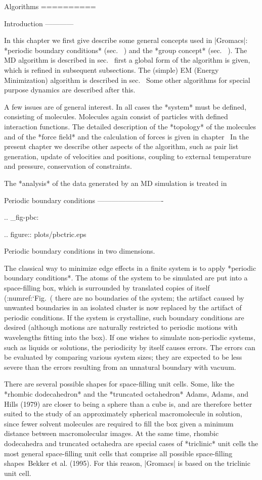 Algorithms
==========

Introduction
------------

In this chapter we first give describe some general concepts used in
|Gromacs|: *periodic boundary conditions*
(sec. 
) and the *group concept*
(sec. 
). The MD algorithm is
described in sec. 
first a global form of the
algorithm is given, which is refined in subsequent subsections. The
(simple) EM (Energy Minimization) algorithm is described in
sec. 
Some other algorithms for special
purpose dynamics are described after this.

A few issues are of general interest. In all cases the *system* must be
defined, consisting of molecules. Molecules again consist of particles
with defined interaction functions. The detailed description of the
*topology* of the molecules and of the *force field* and the calculation
of forces is given in chapter 
In the present
chapter we describe other aspects of the algorithm, such as pair list
generation, update of velocities and positions, coupling to external
temperature and pressure, conservation of constraints.

The *analysis* of the data generated by an MD simulation is treated in 

Periodic boundary conditions
----------------------------

.. _fig-pbc:

.. figure:: plots/pbctric.eps

   Periodic boundary conditions in two dimensions.

The classical way to minimize edge effects in a finite system is to
apply *periodic boundary conditions*. The atoms of the system to be
simulated are put into a space-filling box, which is surrounded by
translated copies of itself (:numref:`Fig. (%
there are no boundaries of the system; the artifact caused by unwanted
boundaries in an isolated cluster is now replaced by the artifact of
periodic conditions. If the system is crystalline, such boundary
conditions are desired (although motions are naturally restricted to
periodic motions with wavelengths fitting into the box). If one wishes
to simulate non-periodic systems, such as liquids or solutions, the
periodicity by itself causes errors. The errors can be evaluated by
comparing various system sizes; they are expected to be less severe than
the errors resulting from an unnatural boundary with vacuum.

There are several possible shapes for space-filling unit cells. Some,
like the *rhombic dodecahedron*
and the *truncated
octahedron*
Adams, Adams, and
Hills (1979) are closer to being a sphere than a cube is, and are
therefore better suited to the study of an approximately spherical
macromolecule in solution, since fewer solvent molecules are required to
fill the box given a minimum distance between macromolecular images. At
the same time, rhombic dodecahedra and truncated octahedra are special
cases of *triclinic* unit cells
the most general space-filling unit cells that comprise all possible
space-filling shapes Bekker et al. (1995). For this reason, |Gromacs| is
based on the triclinic unit cell.

